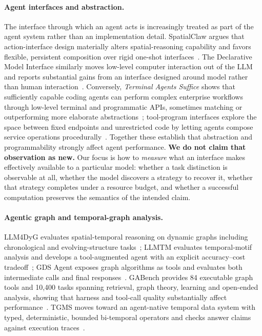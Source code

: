 \documentclass[sigconf,anonymous,review]{acmart}
\begin{document}
\paragraph{Agent interfaces and abstraction.}
The interface through which an agent acts is increasingly treated as part of the agent system
rather than an implementation detail. SpatialClaw argues that action-interface design materially
alters spatial-reasoning capability and favors flexible, persistent composition over rigid
one-shot interfaces~\cite{spatialclaw2026}. The Declarative Model Interface similarly moves
low-level computer interaction out of the LLM and reports substantial gains from an interface
designed around model rather than human interaction~\cite{dmi2026}. Conversely, \emph{Terminal
Agents Suffice} shows that sufficiently capable coding agents can perform complex enterprise
workflows through low-level terminal and programmatic APIs, sometimes matching or outperforming
more elaborate abstractions~\cite{terminalagents2026}; tool-program interfaces explore the space
between fixed endpoints and unrestricted code by letting agents compose service operations
procedurally~\cite{toolprograms2026}. Together these establish that abstraction and programmability
strongly affect agent performance. \textbf{We do not claim that observation as new.} Our focus is
how to \emph{measure} what an interface makes effectively available to a particular model: whether
a task distinction is observable at all, whether the model discovers a strategy to recover it,
whether that strategy completes under a resource budget, and whether a successful computation
preserves the semantics of the intended claim.

\paragraph{Agentic graph and temporal-graph analysis.}
LLM4DyG evaluates spatial-temporal reasoning on dynamic graphs including chronological and
evolving-structure tasks~\cite{llm4dyg2024}; LLMTM evaluates temporal-motif analysis and develops a
tool-augmented agent with an explicit accuracy--cost tradeoff~\cite{llmtm2026}; GDS Agent exposes
graph algorithms as tools and evaluates both intermediate calls and final
responses~\cite{gdsagent2025}. GABench provides 84 executable graph tools and 10{,}400 tasks
spanning retrieval, graph theory, learning and open-ended analysis, showing that harness and
tool-call quality substantially affect performance~\cite{gabench2026}. TGMS moves toward an
agent-native temporal data system with typed, deterministic, bounded bi-temporal operators and
checks answer claims against execution traces~\cite{tgms2026}.
\end{document}
